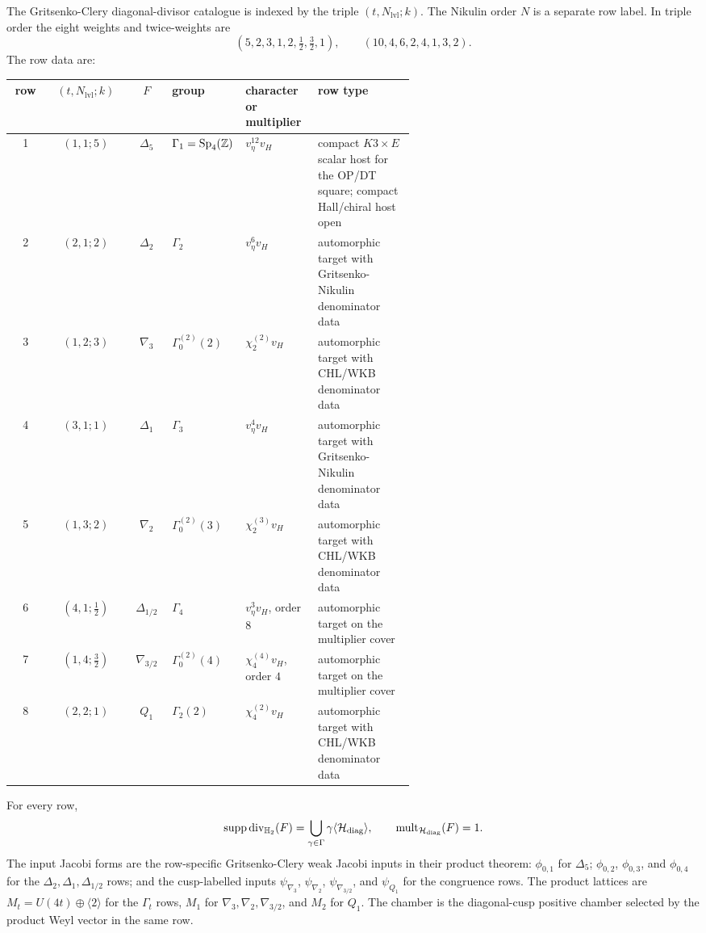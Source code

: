 \begin{proposition}
\label{prop:n578-gc-atlas-separation}
The Gritsenko-Clery diagonal-divisor catalogue is indexed by the
triple \((t,N_{\mathrm{lvl}};k)\).  The Nikulin order \(N\) is a
separate row label.  In triple order the eight weights and twice-weights
are
\[
  (5,2,3,1,2,\tfrac12,\tfrac32,1),\qquad
  (10,4,6,2,4,1,3,2).
\]
The row data are:
\begin{center}
\begin{tabular}{c|c|c|p{0.16\linewidth}|p{0.18\linewidth}|p{0.24\linewidth}}
row & \((t,N_{\mathrm{lvl}};k)\) & \(F\) & group &
character or multiplier & row type\\ \hline
1 & \((1,1;5)\) & \(\Delta_5\) & \(\Gamma_1=\mathrm{Sp}_4(\mathbb{Z})\) &
\(v_\eta^{12}v_H\) &
compact \(K3\times E\) scalar host for the OP/DT square; compact
Hall/chiral host open\\
2 & \((2,1;2)\) & \(\Delta_2\) & \(\Gamma_2\) &
\(v_\eta^{6}v_H\) &
automorphic target with Gritsenko-Nikulin denominator data\\
3 & \((1,2;3)\) & \(\nabla_3\) & \(\Gamma_0^{(2)}(2)\) &
\(\chi_2^{(2)}v_H\) &
automorphic target with CHL/WKB denominator data\\
4 & \((3,1;1)\) & \(\Delta_1\) & \(\Gamma_3\) &
\(v_\eta^{4}v_H\) &
automorphic target with Gritsenko-Nikulin denominator data\\
5 & \((1,3;2)\) & \(\nabla_2\) & \(\Gamma_0^{(2)}(3)\) &
\(\chi_2^{(3)}v_H\) &
automorphic target with CHL/WKB denominator data\\
6 & \((4,1;\tfrac12)\) & \(\Delta_{1/2}\) & \(\Gamma_4\) &
\(v_\eta^{3}v_H\), order \(8\) &
automorphic target on the multiplier cover\\
7 & \((1,4;\tfrac32)\) & \(\nabla_{3/2}\) &
\(\Gamma_0^{(2)}(4)\) &
\(\chi_4^{(4)}v_H\), order \(4\) &
automorphic target on the multiplier cover\\
8 & \((2,2;1)\) & \(Q_1\) & \(\Gamma_2(2)\) &
\(\chi_4^{(2)}v_H\) &
automorphic target with CHL/WKB denominator data
\end{tabular}
\end{center}
For every row,
\[
  \operatorname{supp}\operatorname{div}_{\mathbb H_2}(F)
  =\bigcup_{\gamma\in\Gamma}\gamma\langle\mathcal H_{\mathrm{diag}}\rangle,\qquad
  \operatorname{mult}_{\mathcal H_{\mathrm{diag}}}(F)=1.
\]
The input Jacobi forms are the row-specific Gritsenko-Clery weak Jacobi
inputs in their product theorem: \(\phi_{0,1}\) for \(\Delta_5\);
\(\phi_{0,2}\), \(\phi_{0,3}\), and \(\phi_{0,4}\) for the
\(\Delta_2,\Delta_1,\Delta_{1/2}\) rows; and the cusp-labelled
inputs \(\psi_{\nabla_3}\), \(\psi_{\nabla_2}\),
\(\psi_{\nabla_{3/2}}\), and \(\psi_{Q_1}\) for the congruence rows.
The product lattices are \(M_t=U(4t)\oplus\langle2\rangle\) for the
\(\Gamma_t\) rows, \(M_1\) for \(\nabla_3,\nabla_2,\nabla_{3/2}\), and
\(M_2\) for \(Q_1\).  The chamber is the diagonal-cusp positive chamber
selected by the product Weyl vector in the same row.
\end{proposition}

